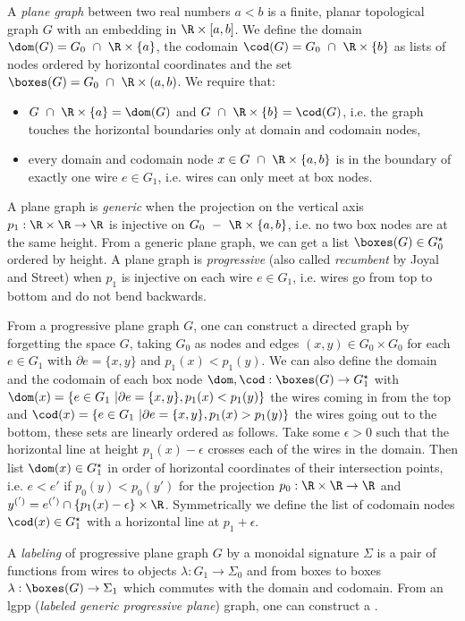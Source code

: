 A \emph{plane graph} between two real numbers $a < b$ is a finite, planar topological graph $G$ with an embedding in $\R \times [a, b]$.
We define the domain $\dom(G) = G_0 \ \cap \ \R \times \{ a \}$, the codomain $\cod(G) = G_0 \ \cap \ \R \times \{ b \}$ as lists of nodes ordered by horizontal coordinates and the set $\boxes(G) = G_0 \ \cap \ \R \times (a, b)$.
We require that:
\begin{itemize}
    \item $G \ \cap \ \R \times \{ a \} = \dom(G)$ and $G \ \cap \ \R \times \{ b \} = \cod(G)$, i.e. the graph touches the horizontal boundaries only at domain and codomain nodes,
    \item every domain and codomain node $x \in G \ \cap \ \R \times \{ a, b \}$ is in the boundary of exactly one wire $e \in G_1$, i.e. wires can only meet at box nodes.
\end{itemize}
A plane graph is \emph{generic} when the projection on the vertical axis $p_1 : \R \times \R \to \R$ is injective on $G_0 \ - \ \R \times \{ a, b \}$, i.e. no two box nodes are at the same height.
From a generic plane graph, we can get a list $\boxes(G) \in G_0^\star$ ordered by height.
A plane graph is \emph{progressive} (also called \emph{recumbent} by Joyal and Street) when $p_1$ is injective on each wire $e \in G_1$, i.e. wires go from top to bottom and do not bend backwards.

From a progressive plane graph $G$, one can construct a directed graph by forgetting the space $G$, taking $G_0$ as nodes and edges $(x, y) \in G_0 \times G_0$ for each $e \in G_1$ with $\partial e = \{ x, y \}$ and $p_1(x) < p_1(y)$.
We can also define the domain and the codomain of each box node $\dom, \cod : \boxes(G) \to G_1^\star$ with
$\dom(x) = \{ e \in G_1 \ \vert \partial e = \{ x, y \}, p_1(x) < p_1(y) \}$ the wires coming in from the top and
$\cod(x) = \{ e \in G_1 \ \vert \partial e = \{ x, y \}, p_1(x) > p_1(y) \}$ the wires going out to the bottom, these sets are linearly ordered as follows.
Take some $\epsilon > 0$ such that the horizontal line at height $p_1(x) - \epsilon$ crosses each of the wires in the domain.
Then list $\dom(x) \in G_1^\star$ in order of horizontal coordinates of their intersection points, i.e. $e < e'$ if $p_0(y) < p_0(y')$ for the projection $p_0 : \R \times \R \to \R$ and $y^{(')} = e^{(')} \cap \{ p_1(x) - \epsilon \} \times \R$. Symmetrically we define the list of codomain nodes $\cod(x) \in G_1^\star$ with a horizontal line at $p_1 + \epsilon$.

A \emph{labeling} of progressive plane graph $G$ by a monoidal signature $\Sigma$ is a pair of functions from wires to objects $\lambda : G_1 \to \Sigma_0$ and from boxes to boxes $\lambda : \boxes(G) \to \Sigma_1$ which commutes with the domain and codomain.
From an lgpp (\emph{labeled generic progressive plane}) graph, one can construct a .

